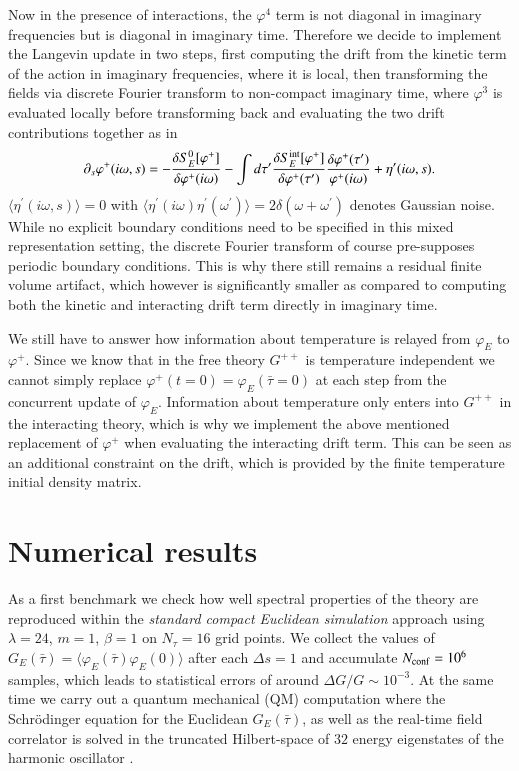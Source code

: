 \documentclass[epj]{webofc}
\begin{document}
Now in the presence of interactions, the $\varphi^4$ term is not diagonal in imaginary frequencies but is diagonal in imaginary time. Therefore we decide to implement the Langevin update in two steps, first computing the drift from the kinetic term of the action in imaginary frequencies, where it is local, then transforming the fields via discrete Fourier transform to non-compact imaginary time, where $\varphi^3$ is evaluated locally before transforming back and evaluating the two drift contributions together as in 
\begin{align}
\partial_s \varphi^+(i\omega,s)=-\frac{\delta S_E^0[\varphi^+]}{\delta \varphi^+(i\omega)}-\int d\tau^\prime \frac{\delta S_E^{\rm int}[\varphi^+]}{\delta \varphi^+(\tau^\prime)} \frac{\delta \varphi^+(\tau^\prime)}{\varphi^+(i\omega)}+\eta^\prime(i\omega,s).
\end{align}
$\langle \eta^\prime(i\omega,s)\rangle=0$ with $\langle \eta^\prime(i\omega)\eta^\prime(\omega^\prime)\rangle=2\delta(\omega+\omega^\prime)$ denotes Gaussian noise.
While no explicit boundary conditions need to be specified in this mixed representation setting, the discrete Fourier transform of course pre-supposes periodic boundary conditions. This is why there still remains a residual finite volume artifact, which however is significantly smaller as compared to computing both the kinetic and interacting drift term directly in imaginary time. 

We still have to answer how information about temperature is relayed from $\varphi_E$ to $\varphi^+$. Since we know that in the free theory $G^{++}$ is temperature independent we cannot simply replace $\varphi^+(t=0)=\varphi_E(\bar{\tau}=0)$ at each step from the concurrent update of $\varphi_E$. Information about temperature only enters into $G^{++}$ in the interacting theory, which is why we implement the above mentioned replacement of $\varphi^+$ when evaluating the interacting drift term. This can be seen as an additional constraint on the drift, which is provided by the finite temperature initial density matrix.

\section{Numerical results}\label{sec-2}

As a first benchmark we check how well spectral properties of the theory are reproduced within the {\it standard compact Euclidean simulation} approach using $\lambda=24$, $m=1$, $\beta=1$ on $N_\tau=16$ grid points.  We collect the values of $G_E(\bar\tau)=\langle \varphi_E(\bar\tau)\varphi_E(0)\rangle$ after each $\Delta s=1$ and accumulate $N_{\rm conf}=10^6$ samples, which leads to statistical errors of around $\Delta G/G\sim10^{-3}$. At the same time we carry out a quantum mechanical (QM) computation where the Schr\"odinger equation for the Euclidean $G_E(\bar\tau)$, as well as the real-time field correlator is solved in the truncated Hilbert-space of $32$ energy eigenstates of the harmonic oscillator \cite{Berges:2006xc}.
\end{document}
